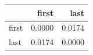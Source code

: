 \begin{tabular}{lrr}
\toprule
 & first & last \\
\midrule
first & 0.0000 & 0.0174 \\
last & 0.0174 & 0.0000 \\
\bottomrule
\end{tabular}
